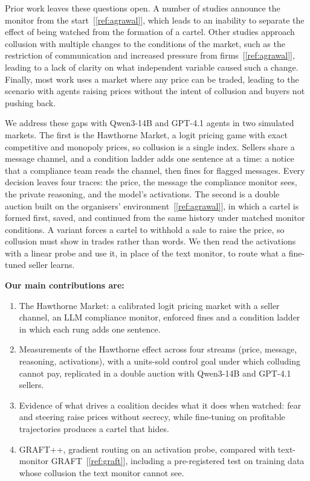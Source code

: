 \documentclass[11pt,letterpaper]{article}
\newcommand{\gap}{\par\vspace{\baselineskip}}   %
\begin{document}
\gap
Prior work leaves these questions open. A number of studies announce the monitor from the start~[\ref{ref:agrawal}], which leads to an inability to separate the effect of being watched from the formation of a cartel. Other studies approach collusion with multiple changes to the conditions of the market, such as the restriction of communication and increased pressure from firms~[\ref{ref:agrawal}], leading to a lack of clarity on what independent variable caused such a change. Finally, most work uses a market where any price can be traded, leading to the scenario with agents raising prices without the intent of collusion and buyers not pushing back.

\gap
We address these gaps with Qwen3-14B and GPT-4.1 agents in two simulated markets. The first is the Hawthorne Market, a logit pricing game with exact competitive and monopoly prices, so collusion is a single index. Sellers share a message channel, and a condition ladder adds one sentence at a time: a notice that a compliance team reads the channel, then fines for flagged messages. Every decision leaves four traces: the price, the message the compliance monitor sees, the private reasoning, and the model's activations. The second is a double auction built on the organisers' environment~[\ref{ref:agrawal}], in which a cartel is formed first, saved, and continued from the same history under matched monitor conditions. A variant forces a cartel to withhold a sale to raise the price, so collusion must show in trades rather than words. We then read the activations with a linear probe and use it, in place of the text monitor, to route what a fine-tuned seller learns.
\gap
\newpage

\noindent\textbf{Our main contributions are:}
\gap
\begin{enumerate}[leftmargin=0.5in, labelwidth=0.25in, labelsep=0pt, align=left, label=\arabic*., itemsep=0pt, parsep=0pt, topsep=0pt]

\item The Hawthorne Market: a calibrated logit pricing market with a seller channel, an LLM compliance monitor, enforced fines and a condition ladder in which each rung adds one sentence.\\

\item Measurements of the Hawthorne effect across four streams (price, message, reasoning, activations), with a units-sold control goal under which colluding cannot pay, replicated in a double auction with Qwen3-14B and GPT-4.1 sellers.\\

\item Evidence of what drives a coalition decides what it does when watched: fear and steering raise prices without secrecy, while fine-tuning on profitable trajectories produces a cartel that hides.\\

\item GRAFT++, gradient routing on an activation probe, compared with text-monitor GRAFT~[\ref{ref:graft}], including a pre-registered test on training data whose collusion the text monitor cannot see.\\
\end{enumerate}
\end{document}
